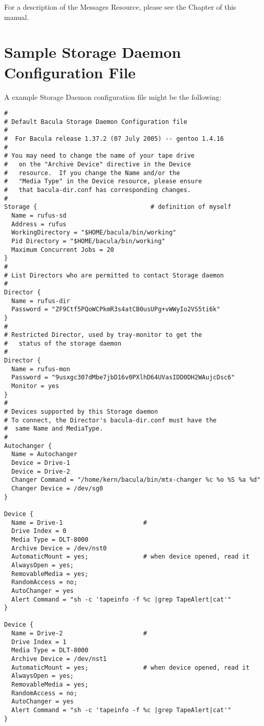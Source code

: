 For a description of the Messages Resource, please see the 
 Chapter of this
manual. 

\section{Sample Storage Daemon Configuration File}
\label{SampleConfiguration}

A example Storage Daemon configuration file might be the following: 

\footnotesize
\begin{verbatim}
#
# Default Bacula Storage Daemon Configuration file
#
#  For Bacula release 1.37.2 (07 July 2005) -- gentoo 1.4.16
#
# You may need to change the name of your tape drive
#   on the "Archive Device" directive in the Device
#   resource.  If you change the Name and/or the
#   "Media Type" in the Device resource, please ensure
#   that bacula-dir.conf has corresponding changes.
#
Storage {                               # definition of myself
  Name = rufus-sd
  Address = rufus
  WorkingDirectory = "$HOME/bacula/bin/working"
  Pid Directory = "$HOME/bacula/bin/working"
  Maximum Concurrent Jobs = 20
}
#
# List Directors who are permitted to contact Storage daemon
#
Director {
  Name = rufus-dir
  Password = "ZF9Ctf5PQoWCPkmR3s4atCB0usUPg+vWWyIo2VS5ti6k"
}
#
# Restricted Director, used by tray-monitor to get the
#   status of the storage daemon
#
Director {
  Name = rufus-mon
  Password = "9usxgc307dMbe7jbD16v0PXlhD64UVasIDD0DH2WAujcDsc6"
  Monitor = yes
}
#
# Devices supported by this Storage daemon
# To connect, the Director's bacula-dir.conf must have the
#  same Name and MediaType.
#
Autochanger {
  Name = Autochanger
  Device = Drive-1
  Device = Drive-2
  Changer Command = "/home/kern/bacula/bin/mtx-changer %c %o %S %a %d"
  Changer Device = /dev/sg0
}

Device {
  Name = Drive-1                      #
  Drive Index = 0 
  Media Type = DLT-8000
  Archive Device = /dev/nst0
  AutomaticMount = yes;               # when device opened, read it
  AlwaysOpen = yes;
  RemovableMedia = yes;
  RandomAccess = no;
  AutoChanger = yes
  Alert Command = "sh -c 'tapeinfo -f %c |grep TapeAlert|cat'"
}

Device {
  Name = Drive-2                      #
  Drive Index = 1
  Media Type = DLT-8000
  Archive Device = /dev/nst1
  AutomaticMount = yes;               # when device opened, read it
  AlwaysOpen = yes;
  RemovableMedia = yes;
  RandomAccess = no;
  AutoChanger = yes
  Alert Command = "sh -c 'tapeinfo -f %c |grep TapeAlert|cat'"
}


\end{verbatim}
